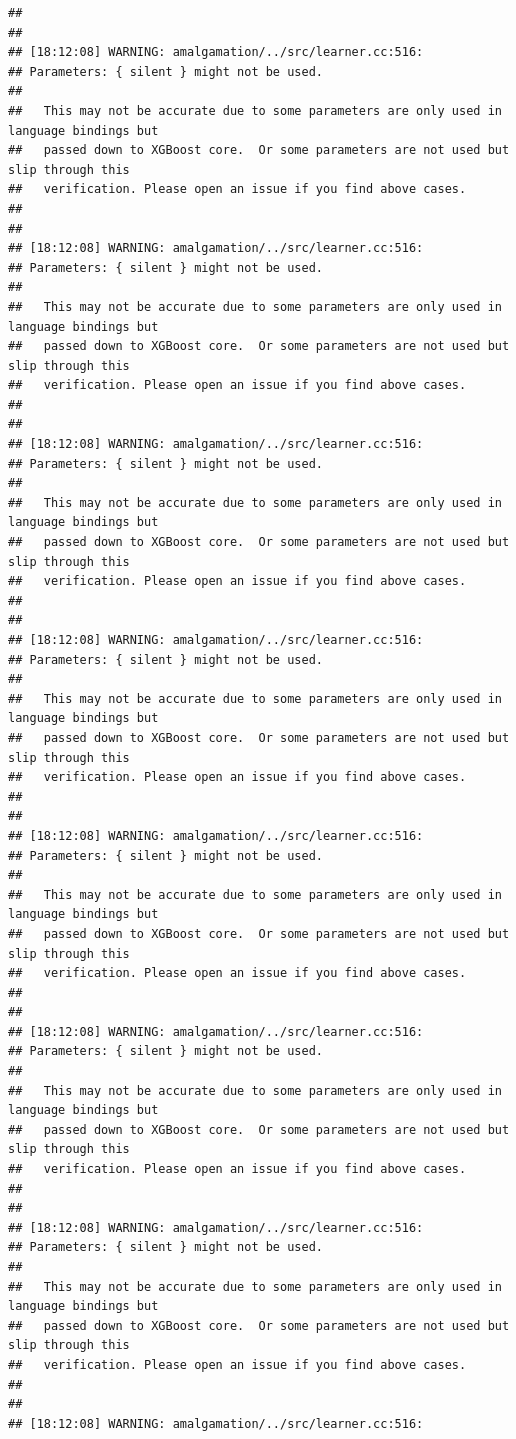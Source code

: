 \documentclass[AMS,STIX2COL]{WileyNJD-v2}\usepackage[]{graphicx}\usepackage[]{color}
\makeatletter
\newenvironment{kframe}{%
 \def\at@end@of@kframe{}%
 \ifinner\ifhmode%
  \def\at@end@of@kframe{\end{minipage}}%
  \begin{minipage}{\columnwidth}%
 \fi\fi%
 \def\FrameCommand##1{\hskip\@totalleftmargin \hskip-\fboxsep
 \colorbox{shadecolor}{##1}\hskip-\fboxsep
     \hskip-\linewidth \hskip-\@totalleftmargin \hskip\columnwidth}%
 \MakeFramed {\advance\hsize-\width
   \@totalleftmargin\z@ \linewidth\hsize
   \@setminipage}}%
 {\par\unskip\endMakeFramed%
 \at@end@of@kframe}
\newenvironment{knitrout}{}{} %
\makeatother
\begin{document}
\begin{knitrout}
\begin{kframe}
\begin{verbatim}
## 
## 
## [18:12:08] WARNING: amalgamation/../src/learner.cc:516: 
## Parameters: { silent } might not be used.
## 
##   This may not be accurate due to some parameters are only used in language bindings but
##   passed down to XGBoost core.  Or some parameters are not used but slip through this
##   verification. Please open an issue if you find above cases.
## 
## 
## [18:12:08] WARNING: amalgamation/../src/learner.cc:516: 
## Parameters: { silent } might not be used.
## 
##   This may not be accurate due to some parameters are only used in language bindings but
##   passed down to XGBoost core.  Or some parameters are not used but slip through this
##   verification. Please open an issue if you find above cases.
## 
## 
## [18:12:08] WARNING: amalgamation/../src/learner.cc:516: 
## Parameters: { silent } might not be used.
## 
##   This may not be accurate due to some parameters are only used in language bindings but
##   passed down to XGBoost core.  Or some parameters are not used but slip through this
##   verification. Please open an issue if you find above cases.
## 
## 
## [18:12:08] WARNING: amalgamation/../src/learner.cc:516: 
## Parameters: { silent } might not be used.
## 
##   This may not be accurate due to some parameters are only used in language bindings but
##   passed down to XGBoost core.  Or some parameters are not used but slip through this
##   verification. Please open an issue if you find above cases.
## 
## 
## [18:12:08] WARNING: amalgamation/../src/learner.cc:516: 
## Parameters: { silent } might not be used.
## 
##   This may not be accurate due to some parameters are only used in language bindings but
##   passed down to XGBoost core.  Or some parameters are not used but slip through this
##   verification. Please open an issue if you find above cases.
## 
## 
## [18:12:08] WARNING: amalgamation/../src/learner.cc:516: 
## Parameters: { silent } might not be used.
## 
##   This may not be accurate due to some parameters are only used in language bindings but
##   passed down to XGBoost core.  Or some parameters are not used but slip through this
##   verification. Please open an issue if you find above cases.
## 
## 
## [18:12:08] WARNING: amalgamation/../src/learner.cc:516: 
## Parameters: { silent } might not be used.
## 
##   This may not be accurate due to some parameters are only used in language bindings but
##   passed down to XGBoost core.  Or some parameters are not used but slip through this
##   verification. Please open an issue if you find above cases.
## 
## 
## [18:12:08] WARNING: amalgamation/../src/learner.cc:516: 

\end{verbatim}
\end{kframe}
\end{knitrout}
\end{document}
